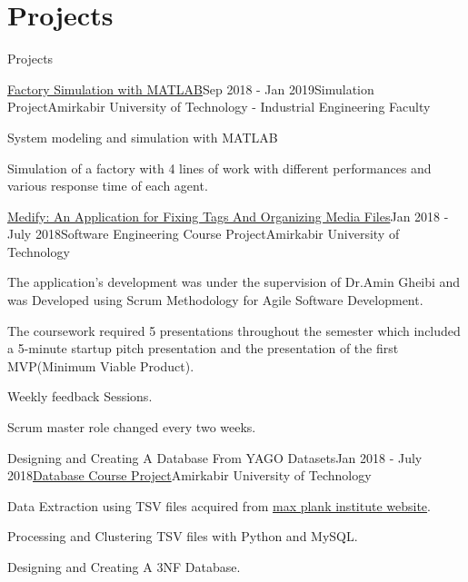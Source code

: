 \documentclass{resume} %
\begin{document}
	\section{Projects}
	\begin{rSection}{Projects}
		
		\begin{rSubsection}{\href{https://github.com/pouyaaghahoseini/System-Queueing-Simulation}{Factory Simulation with MATLAB}}{Sep 2018 - Jan 2019}{Simulation  Project}{Amirkabir University of Technology - Industrial Engineering Faculty}
			\item System modeling and simulation with MATLAB
			\item Simulation of a factory with 4 lines of work with different performances and various response time of each agent.
			
			
		\end{rSubsection}
	
		\begin{rSubsection}{\href{https://github.com/pouyaaghahoseini/Medify}{Medify: An Application for Fixing Tags And Organizing Media Files}}{Jan 2018 - July 2018}{Software Engineering Course Project}{Amirkabir University of Technology}
			
			\item The application's development was under the supervision of Dr.Amin Gheibi and was Developed using Scrum Methodology for Agile Software Development.
			\item The coursework required 5 presentations throughout the semester which included a 5-minute startup pitch presentation and the presentation of the first MVP(Minimum Viable Product).
			\item Weekly feedback Sessions.
			\item Scrum master role changed every two weeks.	
		\end{rSubsection}
		
		\begin{rSubsection}{Designing and Creating A Database From YAGO Datasets}{Jan 2018 - July 2018}{\href{https://github.com/pouyaaghahoseini/Database-Course}{Database Course Project}}{Amirkabir University of Technology}
			\item Data Extraction using TSV files acquired from \href{https://www.mpi-inf.mpg.de/departments/databases-and-information-systems/research/yago-naga/yago/downloads/}{max plank institute website}.
			\item Processing and Clustering TSV files with Python and MySQL.
			\item Designing and Creating A 3NF Database.
			

\end{rSubsection}
\end{rSection}
\end{document}
